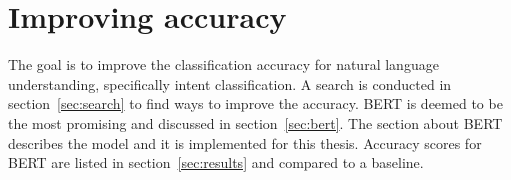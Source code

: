 \chapter{Improving accuracy}
\label{ch:improving_accuracy}

The goal is to improve the classification accuracy for natural language understanding, specifically intent classification.
A search is conducted in section~\ref{sec:search} to find ways to improve the accuracy.
BERT is deemed to be the most promising and discussed in section~\ref{sec:bert}.
The section about BERT describes the model and it is implemented for this thesis.
Accuracy scores for BERT are listed in section~\ref{sec:results} and compared to a baseline.






